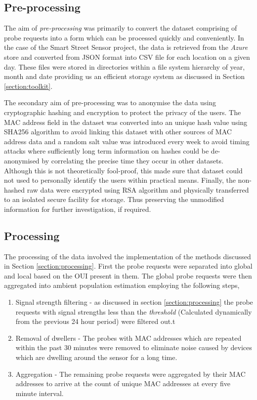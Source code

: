 \subsection{Pre-processing}
The aim of \textit{pre-processing} was primarily to convert the dataset comprising of probe requests into a form which can be processed quickly and conveniently.
In the case of the Smart Street Sensor project, the data is retrieved from the \textit{Azure} store and converted from JSON format into CSV file for each location on a given day.
These files were stored in directories within a file system hierarchy of year, month and date providing us an efficient storage system as discussed in Section \ref{section:toolkit}.

The secondary aim of pre-processing was to anonymise the data using cryptographic hashing and encryption to protect the privacy of the users.
The MAC address field in the dataset was converted into an unique hash value using SHA256 algorithm to avoid linking this dataset with other sources of MAC address data and a random salt value was introduced every week to avoid timing attacks where sufficiently long term information on hashes could be de-anonymised by correlating the precise time they occur in other datasets.
Although this is not theoretically fool-proof, this made sure that dataset could not used to personally identify the users within practical means.
Finally, the non-hashed raw data were encrypted using RSA algorithm and physically transferred to an isolated secure facility for storage.
Thus preserving the unmodified information for further investigation, if required.

\subsection{Processing}
The processing of the data involved the implementation of the methods discussed in Section \ref{section:processing}.
First the probe requests were separated into global and local based on the OUI present in them. 
The global probe requests were then aggregated into ambient population estimation employing the following steps,

\begin{enumerate}
  \item Signal strength filtering - as discussed in section \ref{section:processing} the probe requests with signal strengths less than the \textit{threshold} (Calculated dynamically from the previous 24 hour period) were filtered out.t
  \item Removal of dwellers - The probes with MAC addresses which are repeated within the past 30 minutes were removed to eliminate noise caused by devices which are dwelling around the sensor for a long time.
  \item Aggregation - The remaining probe requests were aggregated by their MAC addresses to arrive at the count of unique MAC addresses at every five minute interval.
\end{enumerate}

